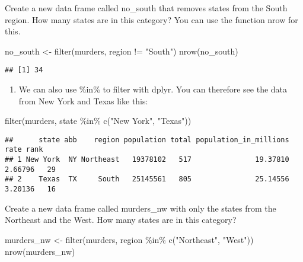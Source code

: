 \documentclass[
]{article}
\newenvironment{Shaded}{\begin{snugshade}}{\end{snugshade}}
\newcommand{\FunctionTok}[1]{\textcolor[rgb]{0.00,0.00,0.00}{#1}}
\newcommand{\NormalTok}[1]{#1}
\newcommand{\OtherTok}[1]{\textcolor[rgb]{0.56,0.35,0.01}{#1}}
\newcommand{\SpecialCharTok}[1]{\textcolor[rgb]{0.00,0.00,0.00}{#1}}
\newcommand{\StringTok}[1]{\textcolor[rgb]{0.31,0.60,0.02}{#1}}
\providecommand{\tightlist}{%
  \setlength{\itemsep}{0pt}\setlength{\parskip}{0pt}}
\begin{document}
Create a new data frame called no\_south that removes states from the
South region. How many states are in this category? You can use the
function nrow for this.

\begin{Shaded}
\begin{Highlighting}[]
\NormalTok{no\_south }\OtherTok{\textless{}{-}} \FunctionTok{filter}\NormalTok{(murders, region }\SpecialCharTok{!=} \StringTok{"South"}\NormalTok{)}
\FunctionTok{nrow}\NormalTok{(no\_south)}
\end{Highlighting}
\end{Shaded}

\begin{verbatim}
## [1] 34
\end{verbatim}

\begin{enumerate}
\def\labelenumi{\arabic{enumi}.}
\setcounter{enumi}{5}
\tightlist
\item
  We can also use \%in\% to filter with dplyr. You can therefore see the
  data from New York and Texas like this:
\end{enumerate}

\begin{Shaded}
\begin{Highlighting}[]
\FunctionTok{filter}\NormalTok{(murders, state }\SpecialCharTok{\%in\%} \FunctionTok{c}\NormalTok{(}\StringTok{"New York"}\NormalTok{, }\StringTok{"Texas"}\NormalTok{))}
\end{Highlighting}
\end{Shaded}

\begin{verbatim}
##      state abb    region population total population_in_millions    rate rank
## 1 New York  NY Northeast   19378102   517               19.37810 2.66796   29
## 2    Texas  TX     South   25145561   805               25.14556 3.20136   16
\end{verbatim}

Create a new data frame called murders\_nw with only the states from the
Northeast and the West. How many states are in this category?

\begin{Shaded}
\begin{Highlighting}[]
\NormalTok{murders\_nw }\OtherTok{\textless{}{-}} \FunctionTok{filter}\NormalTok{(murders, region }\SpecialCharTok{\%in\%} \FunctionTok{c}\NormalTok{(}\StringTok{"Northeast"}\NormalTok{, }\StringTok{"West"}\NormalTok{))}
\FunctionTok{nrow}\NormalTok{(murders\_nw)}
\end{Highlighting}
\end{Shaded}
\end{document}
